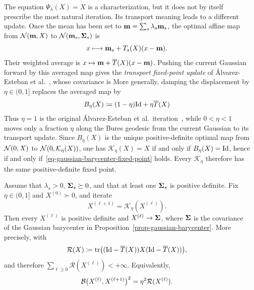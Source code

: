 The equation $\Psi_\lambda(X)=X$ is a characterization, but it does not by itself prescribe the most natural iteration. Its transport meaning leads to a different update. Once the mean has been set to $\mathbf{m}=\sum_s\lambda_s\mathbf{m}_s$, the optimal affine map from $\mathcal{N}(\mathbf{m},X)$ to $\mathcal{N}(\mathbf{m}_s,\mathbf{\Sigma}_s)$ is
\[
	x\longmapsto \mathbf{m}_s+T_s(X)(x-\mathbf{m}).
\]
Their weighted average is $x\mapsto\mathbf{m}+\overline T(X)(x-\mathbf{m})$. Pushing the current Gaussian forward by this averaged map gives the \emph{transport fixed-point update} of \'Alvarez-Esteban et al.~\cite{alvarez2016fixed}, whose covariance is
More generally, damping the displacement by $\eta\in(0,1]$ replaces the averaged map by
\[
	B_\eta(X)
	\coloneqq
	(1-\eta)\mathrm{Id}+\eta\overline T(X)
\]
Thus $\eta=1$ is the original \'Alvarez-Esteban et al.\ iteration~\cite{alvarez2016fixed}, while $0<\eta<1$ moves only a fraction $\eta$ along the Bures geodesic from the current Gaussian to its transport update. Since $B_\eta(X)$ is the unique positive-definite optimal map from $\mathcal{N}(0,X)$ to $\mathcal{N}(0,\mathcal K_\eta(X))$, one has $\mathcal K_\eta(X)=X$ if and only if $B_\eta(X)=\mathrm{Id}$, hence if and only if~\eqref{eq-gaussian-barycenter-fixed-point} holds. Every $\mathcal K_\eta$ therefore has the same positive-definite fixed point.

\begin{prop}\label{prop-gaussian-barycenter-fixed-point-convergence}
	Assume that $\lambda_s>0$, $\mathbf{\Sigma}_s\succeq0$, and that at least one $\mathbf{\Sigma}_s$ is positive definite. Fix $\eta\in(0,1]$ and $X^{(0)}\succ0$, and iterate
	\[
		X^{(\ell+1)}=\mathcal K_\eta(X^{(\ell)}).
	\]
	Then every $X^{(\ell)}$ is positive definite and $X^{(\ell)}\to\mathbf{\Sigma}$, where $\mathbf{\Sigma}$ is the covariance of the Gaussian barycenter in Proposition~\ref{prop-gaussian-barycenter}. More precisely, with
	\[
		\mathcal R(X)
		\coloneqq
		\operatorname{tr}\bigl((\mathrm{Id}-\overline T(X))X(\mathrm{Id}-\overline T(X))\bigr),
	\]
	and therefore $\sum_{\ell\geq0}\mathcal R(X^{(\ell)})<+\infty$. Equivalently,
	\[
		\mathcal{B}\bigl(X^{(\ell)},X^{(\ell+1)}\bigr)^2
		=
		\eta^2\mathcal R(X^{(\ell)}).
	\]
\end{prop}

